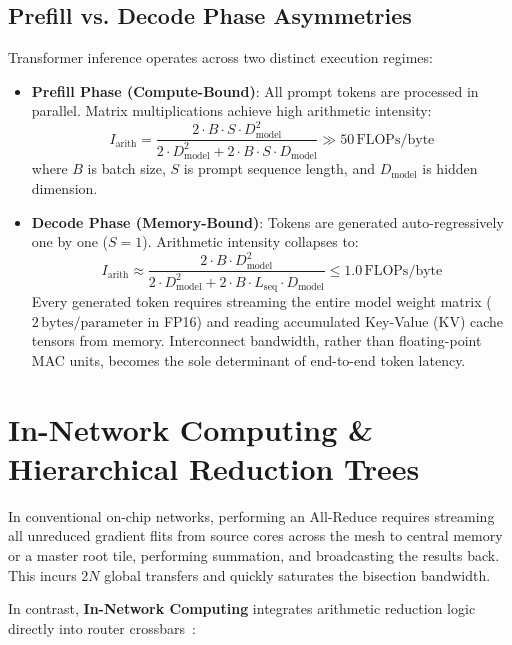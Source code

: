 \subsection{Prefill vs. Decode Phase Asymmetries}
Transformer inference operates across two distinct execution regimes:
\begin{itemize}
    \item \textbf{Prefill Phase (Compute-Bound)}: All prompt tokens are processed in parallel. Matrix multiplications achieve high arithmetic intensity:
    \begin{equation}
    I_{\mathrm{arith}} = \frac{2 \cdot B \cdot S \cdot D_{\mathrm{model}}^2}{2 \cdot D_{\mathrm{model}}^2 + 2 \cdot B \cdot S \cdot D_{\mathrm{model}}} \gg 50\,\mathrm{FLOPs/byte}
    \end{equation}
    where $B$ is batch size, $S$ is prompt sequence length, and $D_{\mathrm{model}}$ is hidden dimension.
    
    \item \textbf{Decode Phase (Memory-Bound)}: Tokens are generated auto-regressively one by one ($S=1$). Arithmetic intensity collapses to:
    \begin{equation}
    I_{\mathrm{arith}} \approx \frac{2 \cdot B \cdot D_{\mathrm{model}}^2}{2 \cdot D_{\mathrm{model}}^2 + 2 \cdot B \cdot L_{\mathrm{seq}} \cdot D_{\mathrm{model}}} \le 1.0\,\mathrm{FLOPs/byte}
    \end{equation}
    Every generated token requires streaming the entire model weight matrix ($2\,\mathrm{bytes/parameter}$ in FP16) and reading accumulated Key-Value (KV) cache tensors from memory. Interconnect bandwidth, rather than floating-point MAC units, becomes the sole determinant of end-to-end token latency.
\end{itemize}

\section{In-Network Computing \& Hierarchical Reduction Trees}
\label{sec:in-network-computing}

In conventional on-chip networks, performing an All-Reduce requires streaming all unreduced gradient flits from source cores across the mesh to central memory or a master root tile, performing summation, and broadcasting the results back. This incurs $2N$ global transfers and quickly saturates the bisection bandwidth.

In contrast, \textbf{In-Network Computing} integrates arithmetic reduction logic directly into router crossbars~\cite{Ouyang2026PAC}:

